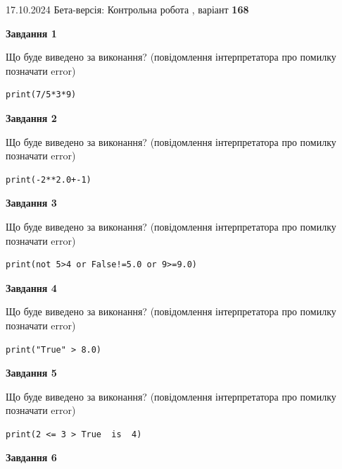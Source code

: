 \documentclass[12pt, ukrainian]{article}
\begin{document}
{\Large{17.10.2024 Бета-версія: Контрольна робота , варіант  \No \textbf { 168 }\par}}
{
\begin {large}
{\begin {center}\textbf{Завдання 1}\end {center}}

Що буде виведено за виконання? (повідомлення інтерпретатора про помилку позначати error)\par
\begin{verbatim}
print(7/5*3*9)
\end{verbatim}

{\begin {center}\textbf{Завдання 2}\end {center}}

Що буде виведено за виконання? (повідомлення інтерпретатора про помилку позначати error)\par
\begin{verbatim}
print(-2**2.0+-1)
\end{verbatim}

{\begin {center}\textbf{Завдання 3}\end {center}}

Що буде виведено за виконання? (повідомлення інтерпретатора про помилку позначати error)\par
\begin{verbatim}
print(not 5>4 or False!=5.0 or 9>=9.0)
\end{verbatim}

{\begin {center}\textbf{Завдання 4}\end {center}}

Що буде виведено за виконання? (повідомлення інтерпретатора про помилку позначати error)\par
\begin{verbatim}
print("True" > 8.0)
\end{verbatim}

{\begin {center}\textbf{Завдання 5}\end {center}}

Що буде виведено за виконання? (повідомлення інтерпретатора про помилку позначати error)\par
\begin{verbatim}
print(2 <= 3 > True  is  4)
\end{verbatim}

{\begin {center}\textbf{Завдання 6}\end {center}}


\end{large}}
\end{document}
